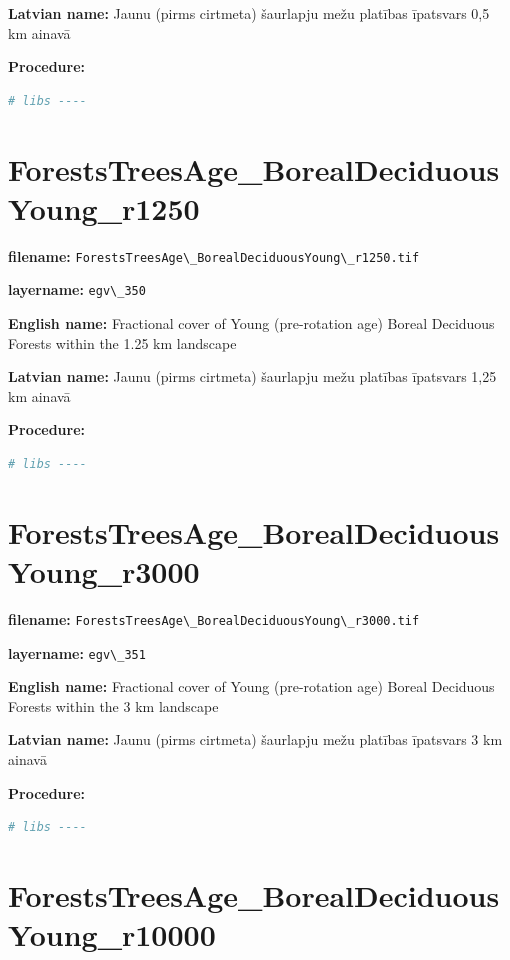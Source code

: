 \documentclass[
]{book}
\newcommand{\passthrough}[1]{#1}
\begin{document}
\textbf{Latvian name:} Jaunu (pirms cirtmeta) šaurlapju mežu platības īpatsvars 0,5 km ainavā

\textbf{Procedure:}

\begin{lstlisting}[language=R]
# libs ----
\end{lstlisting}

\section{ForestsTreesAge\_BorealDeciduousYoung\_r1250}\label{ch06.350}

\textbf{filename:} \passthrough{\lstinline!ForestsTreesAge\_BorealDeciduousYoung\_r1250.tif!}

\textbf{layername:} \passthrough{\lstinline!egv\_350!}

\textbf{English name:} Fractional cover of Young (pre-rotation age) Boreal Deciduous Forests within the 1.25 km landscape

\textbf{Latvian name:} Jaunu (pirms cirtmeta) šaurlapju mežu platības īpatsvars 1,25 km ainavā

\textbf{Procedure:}

\begin{lstlisting}[language=R]
# libs ----
\end{lstlisting}

\section{ForestsTreesAge\_BorealDeciduousYoung\_r3000}\label{ch06.351}

\textbf{filename:} \passthrough{\lstinline!ForestsTreesAge\_BorealDeciduousYoung\_r3000.tif!}

\textbf{layername:} \passthrough{\lstinline!egv\_351!}

\textbf{English name:} Fractional cover of Young (pre-rotation age) Boreal Deciduous Forests within the 3 km landscape

\textbf{Latvian name:} Jaunu (pirms cirtmeta) šaurlapju mežu platības īpatsvars 3 km ainavā

\textbf{Procedure:}

\begin{lstlisting}[language=R]
# libs ----
\end{lstlisting}

\section{ForestsTreesAge\_BorealDeciduousYoung\_r10000}\label{ch06.352}
\end{document}
